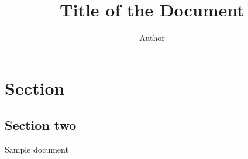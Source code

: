 \documentclass[12pt]{article}
\title{Title of the Document}
\author{Author}
\begin{document}

\section{Section}

\subsection{Section two}

Sample document
\end{document}
